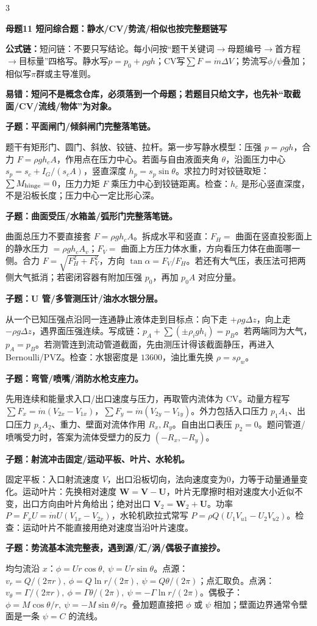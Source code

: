 \documentclass[a4paper]{article}
\newcommand{\mt}[1]{\vspace{0.22pt}\colorbox{M}{\parbox{\dimexpr\linewidth-2\fboxsep}{\color{white}\bfseries #1}}\par}
\newcommand{\qt}[1]{\vspace{0.10pt}\colorbox{Q}{\parbox{\dimexpr\linewidth-2\fboxsep}{\color{white}\bfseries #1}}\par}
\newcommand{\ans}[1]{\colorbox{G}{\parbox{\dimexpr\linewidth-2\fboxsep}{#1}}\par}
\newcommand{\warn}[1]{\colorbox{Y}{\parbox{\dimexpr\linewidth-2\fboxsep}{\color{E}\bfseries #1}}\par}
\newcommand{\form}[1]{{\color{M}\bfseries 公式链：}#1\par}
\begin{document}
\begin{multicols}{3}
\mt{母题11 短问综合题：静水/CV/势流/相似也按完整题链写}
\form{短问链：不要只写结论。每小问按“题干关键词$\to$母题编号$\to$首方程$\to$目标量”四格写。静水写$p=p_0+\rho gh$；CV写$\sum F=\dot m\Delta V$；势流写$\phi/\psi$叠加；相似写$\pi$群或主导准则。}
\warn{易错：短问不是概念仓库，必须落到一个母题；若题目只给文字，也先补“取截面/CV/流线/物体”为对象。}
\qt{子题：平面闸门/倾斜闸门完整落笔链。}
\ans{题干有矩形门、圆门、斜放、铰链、拉杆。第一步写静水模型：压强 $p=\rho gh$，合力 $F=\rho gh_cA$，作用点在压力中心。若面与自由液面夹角 $\theta$，沿面压力中心 $s_p=s_c+I_G/(s_cA)$，竖直深度 $h_p=s_p\sin\theta$。求拉力时对铰链取矩：$\sum M_{\rm hinge}=0$，压力力矩 $F$ 乘压力中心到铰链距离。检查：$h_c$ 是形心竖直深度，不是沿板长度；压力中心一定比形心深。}
\qt{子题：曲面受压/水箱盖/弧形门完整落笔链。}
\ans{曲面总压力不要直接套 $F=\rho gh_cA$。拆成水平和竖直：$F_H=$ 曲面在竖直投影面上的静水压力 $=\rho gh_cA_v$；$F_V=$ 曲面上方压力体水重，方向看压力体在曲面哪一侧。合力 $F=\sqrt{F_H^2+F_V^2}$，方向 $\tan\alpha=F_V/F_H$。若还有大气压，表压法可把两侧大气抵消；若密闭容器有附加压强 $p_0$，再加 $p_0A$ 对应分量。}
\qt{子题：U 管/多管测压计/油水水银分层。}
\ans{从一个已知压强点沿同一连通静止液体走到目标点：向下走 $+\rho g\Delta z$，向上走 $-\rho g\Delta z$，遇界面压强连续。写成链：$p_A+\sum(\pm\rho_i g h_i)=p_B$。若两端同为大气，$p_A=p_B$。若测管连到流动管道截面，先由测压计得该截面静压，再进入 Bernoulli/PVZ。检查：水银密度是 $13600$，油比重先换 $\rho=s\rho_w$。}
\qt{子题：弯管/喷嘴/消防水枪支座力。}
\ans{先用连续和能量求入口/出口速度与压力，再取管内流体为 CV。动量方程写 $\sum F_x=\dot m(V_{2x}-V_{1x})$，$\sum F_y=\dot m(V_{2y}-V_{1y})$。外力包括入口压力 $p_1A_1$、出口压力 $p_2A_2$、重力、壁面对流体作用 $R_x,R_y$。自由出口表压 $p_2=0$。题问管道/喷嘴受力时，答案为流体受壁力的反力 $(-R_x,-R_y)$。}
\qt{子题：射流冲击固定/运动平板、叶片、水轮机。}
\ans{固定平板：入口射流速度 $V$，出口沿板切向，法向速度变为0，力等于动量通量变化。运动叶片：先换相对速度 $\bm W=\bm V-\bm U$，叶片无摩擦时相对速度大小近似不变，出口方向由叶片角给出；绝对出口 $\bm V_2=\bm W_2+\bm U$。功率 $P=F_xU=\dot m U(V_{1x}-V_{2x})$，水轮机欧拉式常写 $P=\rho Q(U_1V_{u1}-U_2V_{u2})$。检查：运动叶片不能直接用绝对速度当沿叶片速度。}
\qt{子题：势流基本流完整表，遇到源/汇/涡/偶极子直接抄。}
\ans{均匀流沿 $x$：$\phi=Ur\cos\theta,\ \psi=Ur\sin\theta$。点源：$v_r=Q/(2\pi r),\ \phi=Q\ln r/(2\pi),\ \psi=Q\theta/(2\pi)$；点汇取负。点涡：$v_\theta=\Gamma/(2\pi r),\ \phi=\Gamma\theta/(2\pi),\ \psi=-\Gamma\ln r/(2\pi)$。偶极子：$\phi=M\cos\theta/r,\ \psi=-M\sin\theta/r$。叠加题直接把 $\phi$ 或 $\psi$ 相加；壁面边界通常令壁面是一条 $\psi=C$ 的流线。}

\end{multicols}
\end{document}
